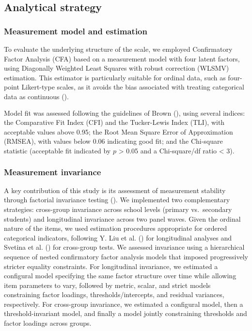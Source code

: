 \documentclass[
  13pt,
]{article}
\begin{document}
\subsection{Analytical strategy}\label{analytical-strategy}

\subsubsection{Measurement model and
estimation}\label{measurement-model-and-estimation}

To evaluate the underlying structure of the scale, we employed
Confirmatory Factor Analysis (CFA) based on a measurement model with
four latent factors, using Diagonally Weighted Least Squares with robust
correction (WLSMV) estimation. This estimator is particularly suitable
for ordinal data, such as four-point Likert-type scales, as it avoids
the bias associated with treating categorical data as continuous
().

Model fit was assessed following the guidelines of Brown
(), using several indices:
the Comparative Fit Index (CFI) and the Tucker-Lewis Index (TLI), with
acceptable values above 0.95; the Root Mean Square Error of
Approximation (RMSEA), with values below 0.06 indicating good fit; and
the Chi-square statistic (acceptable fit indicated by \(p\)
\textgreater{} 0.05 and a Chi-square/df ratio \textless{} 3).

\subsubsection{Measurement invariance}\label{measurement-invariance}

A key contribution of this study is its assessment of measurement
stability through factorial invariance testing
(). We
implemented two complementary strategies: cross-group invariance across
school levels (primary vs.~secondary students) and longitudinal
invariance across two panel waves. Given the ordinal nature of the
items, we used estimation procedures appropriate for ordered categorical
indicators, following Y. Liu et al.
() for longitudinal analyses and
Svetina et al. () for
cross-group tests. We assessed invariance using a hierarchical sequence
of nested confirmatory factor analysis models that imposed progressively
stricter equality constraints. For longitudinal invariance, we estimated
a configural model specifying the same factor structure over time while
allowing item parameters to vary, followed by metric, scalar, and strict
models constraining factor loadings, thresholds/intercepts, and residual
variances, respectively. For cross-group invariance, we estimated a
configural model, then a threshold-invariant model, and finally a model
jointly constraining thresholds and factor loadings across groups.
\end{document}
